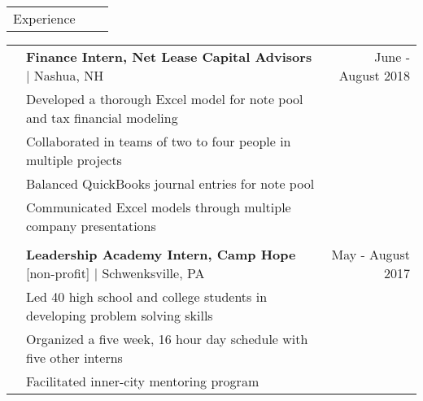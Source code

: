 \documentclass[letterpaper,10pt,oneside]{article}
\begin{document}
 \noindent \begin{tabularx}{\linewidth}{@{} l l R }
     \Large{Experience}\\
 \end{tabularx}     
 \noindent \begin{tabularx}{\linewidth}{@{} l l R }     
     & \textbf{Finance Intern, Net Lease Capital Advisors} $\mid$ Nashua, NH & June - August 2018 \\
     &Developed a thorough Excel model for note pool and tax financial modeling\\
     &Collaborated in teams of two to four people in multiple projects\\
     &Balanced QuickBooks journal entries for note pool\\
     &Communicated Excel models through multiple company presentations\\
     \\
     &\textbf{Leadership Academy Intern, Camp Hope} [non-profit] $\mid$ Schwenksville, PA & May - August 2017\\
     &Led 40 high school and college students in developing problem solving skills\\
     &Organized a five
week, 16 hour day schedule with five other interns\\
	&Facilitated inner-city mentoring program\\
 \end{tabularx}     
\end{document}
